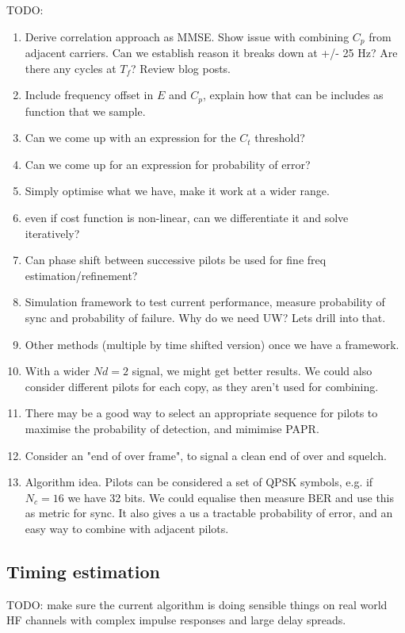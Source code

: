 \documentclass{article}
\begin{document}
TODO: 
\begin{enumerate}
\item Derive correlation approach as MMSE.  Show issue with combining $C_p$ from adjacent carriers. Can we establish reason it breaks down at +/- 25 Hz?  Are there any cycles at $T_f$?  Review blog posts.
\item Include frequency offset in $E$ and $C_p$, explain how that can be includes as function that we sample.
\item Can we come up with an expression for the $C_t$ threshold?
\item Can we come up for an expression for probability of error?
\item Simply optimise what we have, make it work at a wider range.
\item even if cost function is non-linear, can we differentiate it and solve iteratively?
\item Can phase shift between successive pilots be used for fine freq estimation/refinement?
\item Simulation framework to test current performance, measure probability of sync and probability of failure.  Why do we need UW?  Lets drill into that.
\item Other methods (multiple by time shifted version) once we have a framework.
\item With a wider $Nd=2$ signal, we might get better results.  We could also consider different pilots for each copy, as they aren't used for combining.
\item There may be a good way to select an appropriate sequence for pilots to maximise the probability of detection, and mimimise PAPR.
\item Consider an "end of over frame", to signal a clean end of over and squelch.
\item Algorithm idea. Pilots can be considered a set of QPSK symbols, e.g. if $N_c=16$ we have 32 bits. We could equalise then measure BER and use this as metric for sync.  It also gives a us a tractable probability of error, and an easy way to combine with adjacent pilots.
\end{enumerate}

\subsection{Timing estimation}

TODO: make sure the current algorithm is doing sensible things on real world HF channels with complex impulse responses and large delay spreads.
\end{document}

